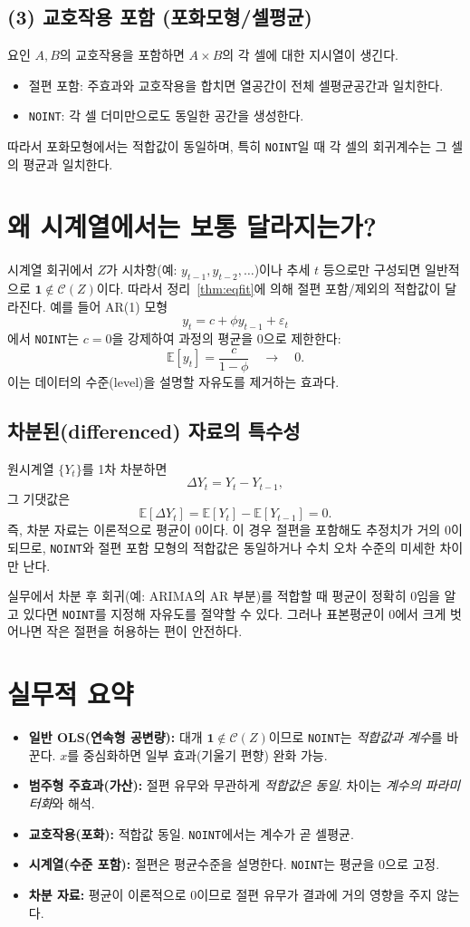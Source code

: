 \documentclass[12pt]{article}
\begin{document}
\subsection*{(3) 교호작용 포함 (포화모형/셀평균)}
요인 $A,B$의 교호작용을 포함하면 $A\times B$의 각 셀에 대한 지시열이 생긴다.
\begin{itemize}
\item 절편 포함: 주효과와 교호작용을 합치면 열공간이 전체 셀평균공간과 일치한다.
\item \texttt{NOINT}: 각 셀 더미만으로도 동일한 공간을 생성한다.
\end{itemize}
따라서 포화모형에서는 적합값이 동일하며, 특히 \texttt{NOINT}일 때 각 셀의 회귀계수는 그 셀의 평균과 일치한다.

\section{왜 시계열에서는 보통 달라지는가?}
시계열 회귀에서 $Z$가 시차항(예: $y_{t-1},y_{t-2},\dots$)이나 추세 $t$ 등으로만 구성되면 일반적으로 $\bm 1\notin\mathcal{C}(Z)$이다.
따라서 정리~\ref{thm:eqfit}에 의해 절편 포함/제외의 적합값이 달라진다.
예를 들어 AR(1) 모형
\[
y_t=c+\phi y_{t-1}+\varepsilon_t
\]
에서 \texttt{NOINT}는 $c=0$을 강제하여 과정의 평균을 $0$으로 제한한다:
\[
\mathbb{E}[y_t]=\frac{c}{1-\phi}\quad\longrightarrow\quad 0.
\]
이는 데이터의 수준(level)을 설명할 자유도를 제거하는 효과다.

\subsection*{차분된(differenced) 자료의 특수성}
원시계열 $\{Y_t\}$를 1차 차분하면
\[
\Delta Y_t = Y_t - Y_{t-1},
\]
그 기댓값은
\[
\mathbb{E}[\Delta Y_t]
   = \mathbb{E}[Y_t] - \mathbb{E}[Y_{t-1}] = 0.
\]
즉, 차분 자료는 이론적으로 평균이 0이다.
이 경우 절편을 포함해도 추정치가 거의 0이 되므로,
\texttt{NOINT}와 절편 포함 모형의 적합값은 동일하거나
수치 오차 수준의 미세한 차이만 난다.
\medskip

실무에서 차분 후 회귀(예: ARIMA의 AR 부분)를 적합할 때
평균이 정확히 0임을 알고 있다면
\texttt{NOINT}를 지정해 자유도를 절약할 수 있다.
그러나 표본평균이 0에서 크게 벗어나면
작은 절편을 허용하는 편이 안전하다.

\section{실무적 요약}
\begin{itemize}
\item \textbf{일반 OLS(연속형 공변량):} 대개 $\bm 1\notin\mathcal{C}(Z)$이므로 \texttt{NOINT}는 \emph{적합값과 계수}를 바꾼다. $x$를 중심화하면 일부 효과(기울기 편향) 완화 가능.
\item \textbf{범주형 주효과(가산):} 절편 유무와 무관하게 \emph{적합값은 동일}. 차이는 \emph{계수의 파라미터화}와 해석.
\item \textbf{교호작용(포화):} 적합값 동일. \texttt{NOINT}에서는 계수가 곧 셀평균.
\item \textbf{시계열(수준 포함):} 절편은 평균수준을 설명한다. \texttt{NOINT}는 평균을 0으로 고정.
\item \textbf{차분 자료:} 평균이 이론적으로 0이므로 절편 유무가 결과에 거의 영향을 주지 않는다.
\end{itemize}
\end{document}
